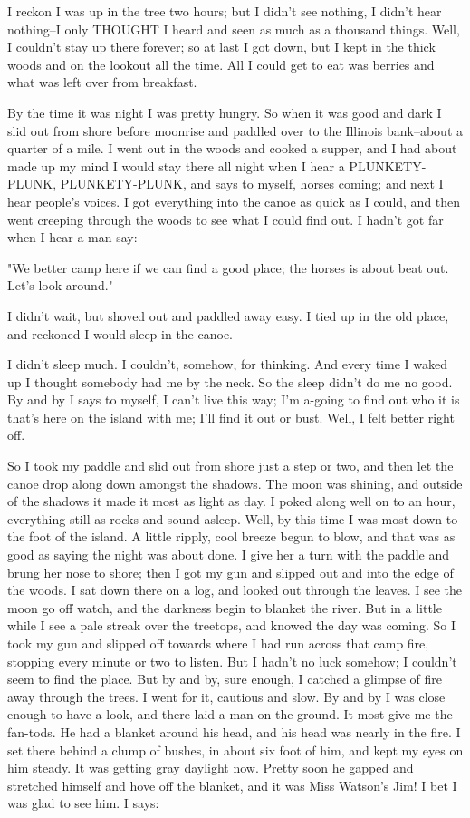 I reckon I was up in the tree two hours; but I didn't see nothing, I
didn't hear nothing--I only THOUGHT I heard and seen as much as a
thousand things.  Well, I couldn't stay up there forever; so at last I
got down, but I kept in the thick woods and on the lookout all the time.
All I could get to eat was berries and what was left over from breakfast.

By the time it was night I was pretty hungry.  So when it was good and
dark I slid out from shore before moonrise and paddled over to the
Illinois bank--about a quarter of a mile.  I went out in the woods and
cooked a supper, and I had about made up my mind I would stay there all
night when I hear a PLUNKETY-PLUNK, PLUNKETY-PLUNK, and says to myself,
horses coming; and next I hear people's voices.  I got everything into
the canoe as quick as I could, and then went creeping through the woods
to see what I could find out.  I hadn't got far when I hear a man say:

"We better camp here if we can find a good place; the horses is about
beat out.  Let's look around."

I didn't wait, but shoved out and paddled away easy.  I tied up in the
old place, and reckoned I would sleep in the canoe.

I didn't sleep much.  I couldn't, somehow, for thinking.  And every time
I waked up I thought somebody had me by the neck.  So the sleep didn't do
me no good.  By and by I says to myself, I can't live this way; I'm
a-going to find out who it is that's here on the island with me; I'll
find it out or bust.  Well, I felt better right off.

So I took my paddle and slid out from shore just a step or two, and then
let the canoe drop along down amongst the shadows.  The moon was shining,
and outside of the shadows it made it most as light as day.  I poked
along well on to an hour, everything still as rocks and sound asleep.
Well, by this time I was most down to the foot of the island.  A little
ripply, cool breeze begun to blow, and that was as good as saying the
night was about done.  I give her a turn with the paddle and brung her
nose to shore; then I got my gun and slipped out and into the edge of the
woods.  I sat down there on a log, and looked out through the leaves.  I
see the moon go off watch, and the darkness begin to blanket the river.
But in a little while I see a pale streak over the treetops, and knowed
the day was coming.  So I took my gun and slipped off towards where I had
run across that camp fire, stopping every minute or two to listen.  But I
hadn't no luck somehow; I couldn't seem to find the place.  But by and
by, sure enough, I catched a glimpse of fire away through the trees.  I
went for it, cautious and slow.  By and by I was close enough to have a
look, and there laid a man on the ground.  It most give me the fan-tods.
He had a blanket around his head, and his head was nearly in the fire.  I
set there behind a clump of bushes, in about six foot of him, and kept my
eyes on him steady.  It was getting gray daylight now.  Pretty soon he
gapped and stretched himself and hove off the blanket, and it was Miss
Watson's Jim!  I bet I was glad to see him.  I says:

